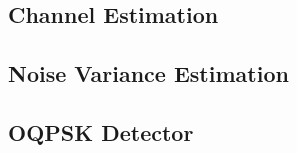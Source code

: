 \subsection{Channel Estimation}
\label{sec:channel_estimation}

\subsection{Noise Variance Estimation}
\label{sec:noise_variance_estimation}

\subsection{OQPSK Detector}
\label{sec:oqpsk_detector}

%
%
%
%
%
